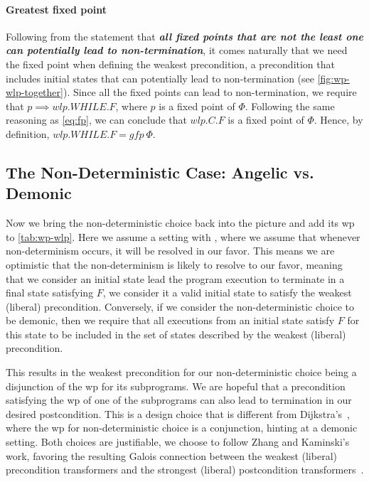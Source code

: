 \paragraph{Greatest fixed point}
Following from the statement that \textbf{\textit{all fixed points that are not the least one can potentially lead to non-termination}}, it comes naturally that we need the  fixed point when defining the weakest  precondition, a precondition that includes  initial states that can potentially lead to non-termination (see \autoref{fig:wp-wlp-together}). 
Since all the fixed points can lead to non-termination, we require that $p \implies wlp.WHILE.F$, where $p$ is a fixed point of $\Phi$.
Following the same reasoning as \autoref{eq:fp}, we can conclude that $wlp.C.F$ is a fixed point of $\Phi$. 
Hence, by definition, $wlp.WHILE.F = gfp\ \Phi$. 


\subsection{The Non-Deterministic Case: Angelic vs. Demonic}\label{sec:wp-nondet}
Now we bring the non-deterministic choice back into the picture and add its wp to \autoref{tab:wp-wlp}. 
Here we assume a setting with , where we assume that whenever non-determinism occurs, it will be resolved in our favor.
This means we are optimistic that the non-determinism is likely to resolve to our favor, meaning that we consider an initial state  lead the program execution to terminate in a final state satisfying $F$, we consider it a valid initial state to satisfy the weakest (liberal) precondition. 
Conversely, if we consider the non-deterministic choice to be demonic, then we require that all executions from an initial state  satisfy $F$ for this state to be included in the set of states described by the weakest (liberal) precondition. 

This results in the weakest precondition for our non-deterministic choice being a disjunction of the wp for its subprograms. 
We are hopeful that a precondition satisfying the wp of one of the subprograms can also lead to termination in our desired postcondition. 
This is a design choice that is different from Dijkstra's~\cite{dijkstra75}, where the wp for non-deterministic choice is a conjunction, hinting at a demonic setting. 
Both choices are justifiable, we choose to follow Zhang and Kaminski's work, favoring the resulting Galois connection between the weakest (liberal) precondition transformers and the strongest (liberal) postcondition transformers~\cite{zhang22}. 


